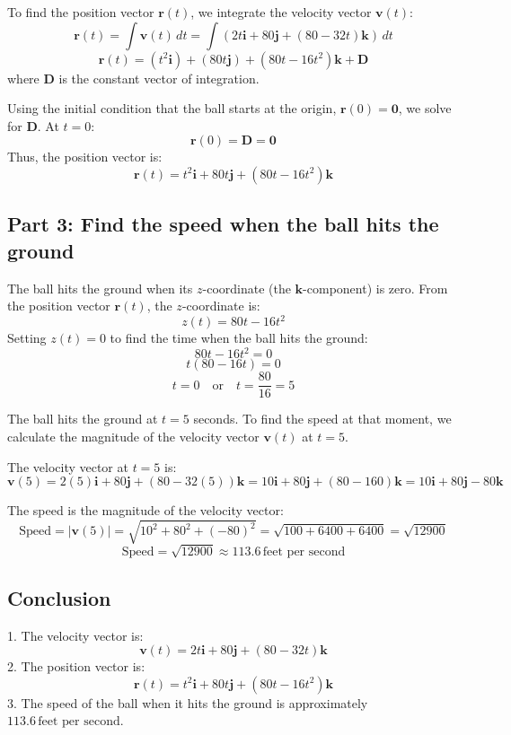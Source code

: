 \documentclass[11pt]{article}
\begin{document}
To find the position vector \( \mathbf{r}(t) \), we integrate the velocity vector \( \mathbf{v}(t) \):
\[
\mathbf{r}(t) = \int \mathbf{v}(t) \, dt = \int (2t \mathbf{i} + 80 \mathbf{j} + (80 - 32t) \mathbf{k}) \, dt
\]
\[
\mathbf{r}(t) = \left( t^2 \mathbf{i} \right) + \left( 80t \mathbf{j} \right) + \left( 80t - 16t^2 \right) \mathbf{k} + \mathbf{D}
\]
where \( \mathbf{D} \) is the constant vector of integration.

Using the initial condition that the ball starts at the origin, \( \mathbf{r}(0) = \mathbf{0} \), we solve for \( \mathbf{D} \). At \( t = 0 \):
\[
\mathbf{r}(0) = \mathbf{D} = \mathbf{0}
\]
Thus, the position vector is:
\[
\mathbf{r}(t) = t^2 \mathbf{i} + 80t \mathbf{j} + (80t - 16t^2) \mathbf{k}
\]

\newpage

\subsection{Part 3: Find the speed when the ball hits the ground}

The ball hits the ground when its \( z \)-coordinate (the \( \mathbf{k} \)-component) is zero. From the position vector \( \mathbf{r}(t) \), the \( z \)-coordinate is:
\[
z(t) = 80t - 16t^2
\]
Setting \( z(t) = 0 \) to find the time when the ball hits the ground:
\[
80t - 16t^2 = 0
\]
\[
t(80 - 16t) = 0
\]
\[
t = 0 \quad \text{or} \quad t = \frac{80}{16} = 5
\]

The ball hits the ground at \( t = 5 \) seconds. To find the speed at that moment, we calculate the magnitude of the velocity vector \( \mathbf{v}(t) \) at \( t = 5 \).

The velocity vector at \( t = 5 \) is:
\[
\mathbf{v}(5) = 2(5) \mathbf{i} + 80 \mathbf{j} + (80 - 32(5)) \mathbf{k} = 10 \mathbf{i} + 80 \mathbf{j} + (80 - 160) \mathbf{k} = 10 \mathbf{i} + 80 \mathbf{j} - 80 \mathbf{k}
\]

The speed is the magnitude of the velocity vector:
\[
\text{Speed} = |\mathbf{v}(5)| = \sqrt{10^2 + 80^2 + (-80)^2} = \sqrt{100 + 6400 + 6400} = \sqrt{12900}
\]
\[
\text{Speed} = \sqrt{12900} \approx 113.6 \, \text{feet per second}
\]

\newpage

\subsection{Conclusion}

1. The velocity vector is:
\[
\mathbf{v}(t) = 2t \mathbf{i} + 80 \mathbf{j} + (80 - 32t) \mathbf{k}
\]
2. The position vector is:
\[
\mathbf{r}(t) = t^2 \mathbf{i} + 80t \mathbf{j} + (80t - 16t^2) \mathbf{k}
\]
3. The speed of the ball when it hits the ground is approximately \( 113.6 \, \text{feet per second} \).
\end{document}
